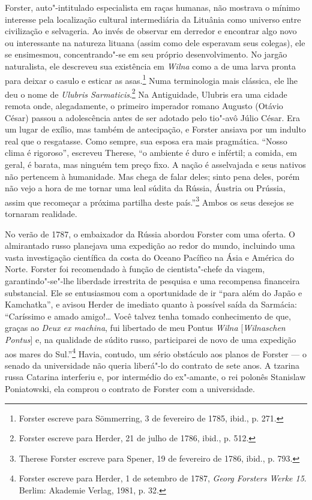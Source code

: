 Forster, auto"-intitulado especialista em raças humanas, não mostrava o
mínimo interesse pela localização cultural intermediária da Lituânia
como universo entre civilização e selvageria. Ao invés de observar em
derredor e encontrar algo novo ou interessante na natureza lituana
(assim como dele esperavam seus colegas), ele se ensimesmou,
concentrando"-se em seu próprio desenvolvimento. No jargão naturalista,
ele descreveu sua existência em \textit{Wilna} como a de uma larva pronta para
deixar o casulo e esticar as asas.\footnote{Forster escreve para Sömmerring, 3 de fevereiro de 1785, ibid., p. 271.} Numa terminologia mais clássica, ele lhe deu o nome de \textit{Ulubris
Sarmaticis}.\footnote{Forster escreve para Herder, 21 de julho de 1786, ibid., p. 512.} Na Antiguidade, Ulubris era uma cidade remota onde, alegadamente, o primeiro imperador romano Augusto (Otávio César) passou
a adolescência antes de ser adotado pelo tio"-avô Júlio César. Era um
lugar de exílio, mas também de antecipação, e Forster ansiava por um
indulto real que o resgatasse. Como sempre, sua esposa era mais
pragmática. ``Nosso clima é rigoroso'', escreveu Therese, ``o ambiente é
duro e infértil; a comida, em geral, é barata, mas ninguém tem preço
fixo. A nação é asselvajada e seus nativos não pertencem à humanidade.
Mas chega de falar deles; sinto pena deles, porém não vejo a hora de me
tornar uma leal súdita da Rússia, Áustria ou Prússia, assim que
recomeçar a próxima partilha deste país.''\footnote{Therese Forster escreve para Spener, 19 de fevereiro de 1786, ibid., p. 793.} Ambos os seus desejos se tornaram realidade.

No verão de 1787, o embaixador da Rússia abordou Forster com uma oferta.
O almirantado russo planejava uma expedição ao redor do mundo, incluindo
uma vasta investigação científica da costa do Oceano Pacífico na Ásia e
América do Norte. Forster foi recomendado à função de cientista"-chefe da
viagem, garantindo"-se"-lhe liberdade irrestrita de pesquisa e uma
recompensa financeira substancial. Ele se entusiasmou com a oportunidade
de ir ``para além do Japão e Kamchatka'', e avisou Herder de imediato
quanto à possível saída da Sarmácia: ``Caríssimo e amado amigo!\ldots{}
Você talvez tenha tomado conhecimento de que, graças ao \textit{Deux ex
machina}, fui libertado de meu Pontus \textit{Wilna} {[}\textit{Wilnaschen
Pontus}{]} e, na qualidade de súdito russo, participarei de novo de uma
expedição aos mares do Sul.''\footnote{Forster escreve para Herder, 1 de setembro de 1787, \textit{Georg Forsters Werke 15}. Berlim: Akademie Verlag, 1981, p. 32.} Havia, contudo, um sério obstáculo aos planos de Forster --- o senado da universidade não queria
liberá"-lo do contrato de sete anos. A tzarina russa Catarina 
interferiu e, por intermédio do ex"-amante, o rei polonês Stanislaw
Poniatowski, ela comprou o contrato de Forster com a universidade.

